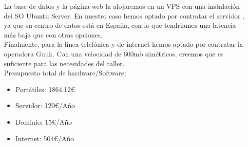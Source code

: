 \documentclass{article}
\begin{document}
La base de datos y la página web la alojaremos en un VPS con una instalación del SO Ubuntu Server. En nuestro caso hemos optado por contratar el servidor \href{https://www.arsys.es/servidores/vps}{\color{red}{Arsys VPS M}},
ya que su centro de datos está en España, con lo que tendriamos una latencia más baja que con otras opciones. \\
Finalmente, para la línea telefónica y de internet hemos optado por contratar la operadora Guuk. Con una velocidad de 600mb simétricos, creemos que es suficiente para las necesidades del taller. \\

Presupuesto total de hardware/Software: \\
\begin{itemize}
  \item Portátiles: 1864.12€
  \item Servidor: 120€/Año
  \item Dominio: 15€/Año
  \item Internet: 504€/Año
\end{itemize}
\end{document}
